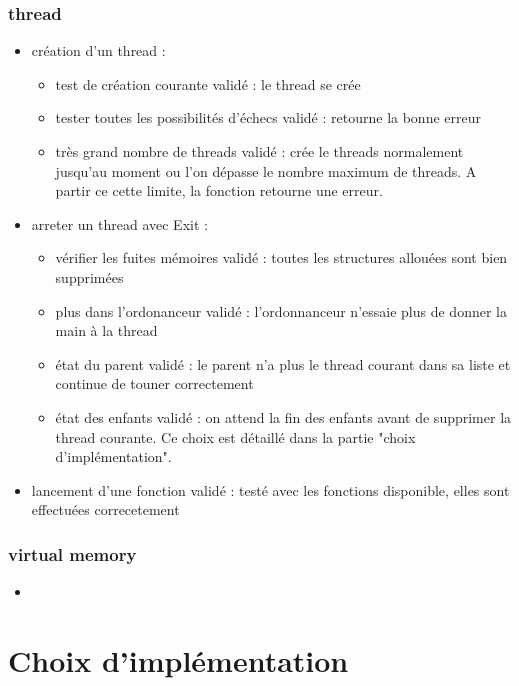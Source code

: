 \documentclass{report}
\begin{document}
		\subsubsection{thread}
			\begin{itemize}
				\item création d'un thread :
					\begin{itemize}
						\item test de création courante 				validé : le thread se crée
						\item tester toutes les possibilités d'échecs	validé : retourne la bonne erreur
						\item très grand nombre de threads 				validé : crée le threads normalement jusqu'au moment ou l'on dépasse le nombre maximum de threads. A partir ce cette limite, la fonction retourne une erreur.
					\end{itemize}
				\item arreter un thread avec Exit :
					\begin{itemize}
						\item vérifier les fuites mémoires		validé : toutes les structures allouées sont bien supprimées
						\item plus dans l'ordonanceur			validé : l'ordonnanceur n'essaie plus de donner la main à la thread
						\item état du parent					validé : le parent n'a plus le thread courant dans sa liste et continue de touner correctement
						\item état des enfants					validé : on attend la fin des enfants avant de supprimer la thread courante. Ce choix est détaillé dans la partie "choix d'implémentation".
					\end{itemize}
				\item lancement d'une fonction		validé : testé avec les fonctions disponible, elles sont effectuées correcetement
			\end{itemize}

		\subsubsection{virtual memory}
			\begin{itemize}
				\item 
			\end{itemize}

\section{Choix d'implémentation}
\end{document}
